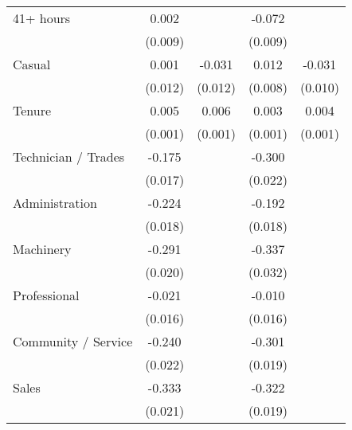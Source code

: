 {\begin{tabular}{l*{4}{c}}
41+ hours           &       0.002         &                     &      -0.072\sym{***}&                     \\
                    &     (0.009)         &                     &     (0.009)         &                     \\
Casual              &       0.001         &      -0.031\sym{**} &       0.012         &      -0.031\sym{***}\\
                    &     (0.012)         &     (0.012)         &     (0.008)         &     (0.010)         \\
Tenure              &       0.005\sym{***}&       0.006\sym{***}&       0.003\sym{***}&       0.004\sym{***}\\
                    &     (0.001)         &     (0.001)         &     (0.001)         &     (0.001)         \\
Technician / Trades &      -0.175\sym{***}&                     &      -0.300\sym{***}&                     \\
                    &     (0.017)         &                     &     (0.022)         &                     \\
Administration      &      -0.224\sym{***}&                     &      -0.192\sym{***}&                     \\
                    &     (0.018)         &                     &     (0.018)         &                     \\
Machinery           &      -0.291\sym{***}&                     &      -0.337\sym{***}&                     \\
                    &     (0.020)         &                     &     (0.032)         &                     \\
Professional        &      -0.021         &                     &      -0.010         &                     \\
                    &     (0.016)         &                     &     (0.016)         &                     \\
Community / Service &      -0.240\sym{***}&                     &      -0.301\sym{***}&                     \\
                    &     (0.022)         &                     &     (0.019)         &                     \\
Sales               &      -0.333\sym{***}&                     &      -0.322\sym{***}&                     \\
                    &     (0.021)         &                     &     (0.019)         &                     \\

\end{tabular}}
